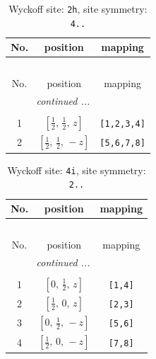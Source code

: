 \documentclass[fleqn,8pt]{jsarticle}
\begin{document}
\begin{longtable}{ccc}
\caption{Wyckoff site: {\tt 2h}, site symmetry: {\tt 4..}}
 \\
 \hline \hline
No. & position & mapping \\ \hline \endfirsthead

\multicolumn{2}{l}{\tablename\ \thetable{}} \\
 \hline \hline
No. & position & mapping \\ \hline \endhead

 \hline \hline
\multicolumn{2}{r}{\footnotesize\it continued ...} \\ \endfoot

 \hline \hline
\multicolumn{2}{r}{} \\ \endlastfoot

1 & $\left[ \frac{1}{2},\, \frac{1}{2},\, z \right]$ & {\tt [1,2,3,4]} \\ \hline
2 & $\left[ \frac{1}{2},\, \frac{1}{2},\, - z \right]$ & {\tt [5,6,7,8]} \\
\end{longtable}
\renewcommand{\arraystretch}{1.2}
\begin{longtable}{ccc}
\caption{Wyckoff site: {\tt 4i}, site symmetry: {\tt 2..}}
 \\
 \hline \hline
No. & position & mapping \\ \hline \endfirsthead

\multicolumn{2}{l}{\tablename\ \thetable{}} \\
 \hline \hline
No. & position & mapping \\ \hline \endhead

 \hline \hline
\multicolumn{2}{r}{\footnotesize\it continued ...} \\ \endfoot

 \hline \hline
\multicolumn{2}{r}{} \\ \endlastfoot

1 & $\left[ 0,\, \frac{1}{2},\, z \right]$ & {\tt [1,4]} \\ \hline
2 & $\left[ \frac{1}{2},\, 0,\, z \right]$ & {\tt [2,3]} \\ \hline
3 & $\left[ 0,\, \frac{1}{2},\, - z \right]$ & {\tt [5,6]} \\ \hline
4 & $\left[ \frac{1}{2},\, 0,\, - z \right]$ & {\tt [7,8]} \\
\end{longtable}
\renewcommand{\arraystretch}{1.2}
\end{document}
